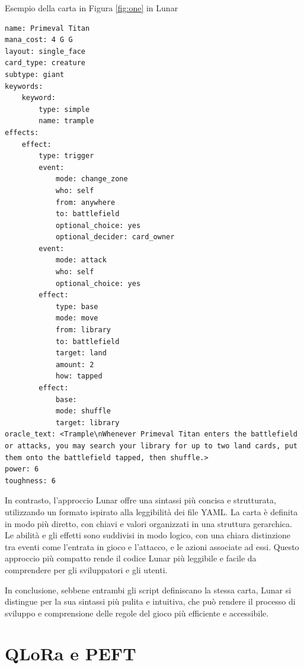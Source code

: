 \begin{algorithm}
	\caption{Esempio della carta in Figura \ref{fig:one} in Lunar}
	\label{lst:prime_titan_lunar}
	\begin{lstlisting}
name: Primeval Titan
mana_cost: 4 G G
layout: single_face 
card_type: creature
subtype: giant
keywords: 
    keyword:
        type: simple
        name: trample
effects:
    effect:
        type: trigger
        event:
            mode: change_zone
            who: self
            from: anywhere
            to: battlefield
            optional_choice: yes
            optional_decider: card_owner
        event:
            mode: attack
            who: self
            optional_choice: yes
        effect:
            type: base
            mode: move
            from: library
            to: battlefield
            target: land
            amount: 2
            how: tapped
        effect:
            base:
            mode: shuffle
            target: library
oracle_text: <Trample\nWhenever Primeval Titan enters the battlefield or attacks, you may search your library for up to two land cards, put them onto the battlefield tapped, then shuffle.>
power: 6
toughness: 6
	\end{lstlisting}
\end{algorithm}


In contrasto, l'approccio Lunar offre una sintassi più concisa e strutturata, utilizzando un formato ispirato alla leggibilità dei file YAML. La carta è definita in modo più diretto, con chiavi e valori organizzati in una struttura gerarchica. Le abilità e gli effetti sono suddivisi in modo logico, con una chiara distinzione tra eventi come l'entrata in gioco e l'attacco, e le azioni associate ad essi. Questo approccio più compatto rende il codice Lunar più leggibile e facile da comprendere per gli sviluppatori e gli utenti.

In conclusione, sebbene entrambi gli script definiscano la stessa carta, Lunar si distingue per la sua sintassi più pulita e intuitiva, che può rendere il processo di sviluppo e comprensione delle regole del gioco più efficiente e accessibile.
       


\section{QLoRa e PEFT}\label{sec:qlora_peft}


